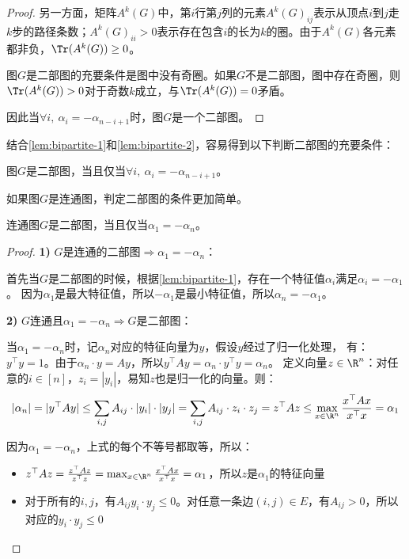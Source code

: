 \documentclass[lang=cn,newtx,10pt,scheme=chinese,chinesefont=nofont,citestyle=gb7714-2015, bibstyle=gb7714-2015]{elegantbook}
\begin{document}
\begin{refsection}
\begin{proof}
    另一方面，矩阵$A^k(G)$中，第$i$行第$j$列的元素$A^k(G)_{ij}$表示从顶点$i$到$j$走$k$步的路径条数；$A^k(G)_{ii}>0$表示存在包含$i$的长为$k$的圈。由于$A^k(G)$各元素都非负，$\Tr(A^k(G))\ge0$。
    
    图$G$是二部图的充要条件是图中没有奇圈。如果$G$不是二部图，图中存在奇圈，则$\Tr(A^k(G))>0$对于奇数$k$成立，与$\Tr(A^k(G))=0$矛盾。
    
    因此当$\forall i,\ \alpha_i=-\alpha_{n-i+1}$时，图$G$是一个二部图。
\end{proof}

结合\cref{lem:bipartite-1}和\cref{lem:bipartite-2}，容易得到以下判断二部图的充要条件：

\begin{theorem}
    图$G$是二部图，当且仅当$\forall i,\ \alpha_i=-\alpha_{n-i+1}$。
\end{theorem}

如果图$G$是连通图，判定二部图的条件更加简单。

\begin{lemma}
    连通图$G$是二部图，当且仅当$\alpha_1=-\alpha_n$。
\end{lemma}
\begin{proof}
    \textbf{1)} $G$是连通的二部图$\Rightarrow\alpha_1=-\alpha_n$：
    
    首先当$G$是二部图的时候，根据\cref{lem:bipartite-1}，存在一个特征值$\alpha_i$满足$\alpha_i=-\alpha_1$。
    因为$\alpha_1$是最大特征值，所以$-\alpha_1$是最小特征值，所以$\alpha_n=-\alpha_1$。

    \textbf{2)} $G$连通且$\alpha_1=-\alpha_n\Rightarrow G$是二部图：
    
    当$\alpha_1=-\alpha_n$时，记$\alpha_n$对应的特征向量为$y$，假设$y$经过了归一化处理，
    有：$y^\top y=1$。由于$\alpha_n\cdot y=Ay$，所以$y^\top Ay=\alpha_n\cdot y^\top y=\alpha_n$。
    定义向量$z\in\R^n$：对任意的$i\in[n]$，$z_i=|y_i|$，易知$z$也是归一化的向量。则：
    \[
    |\alpha_n|=|y^\top Ay|\le\sum_{i,j}A_{ij}\cdot|y_i|\cdot |y_j|
    =\sum_{i,j}A_{ij}\cdot z_i\cdot z_j
    =z^\top Az\le\max_{x\in\R^n}\frac{x^\top Ax}{x^\top x}=\alpha_1
    \]

    因为$\alpha_1=-\alpha_n$，上式的每个不等号都取等，所以：
    \begin{itemize}
        \item $z^\top Az=\frac{z^\top Az}{z^\top z}=\max_{x\in\R^n}\frac{x^\top Ax}{x^\top x}=\alpha_1$，所以$z$是$\alpha_1$的特征向量
        \item 对于所有的$i,j$，有$A_{ij}y_i\cdot y_j\le0$。对任意一条边$(i,j)\in E$，有$A_{ij}>0$，所以对应的$y_i\cdot y_j\le0$
    \end{itemize}


\end{proof}
\end{refsection}
\end{document}
